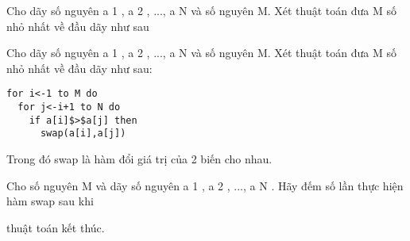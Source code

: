 Cho dãy số nguyên a 1 , a 2 , ..., a N và số nguyên M. Xét thuật toán đưa M số nhỏ nhất về đầu dãy như sau

Cho dãy số nguyên a 1 , a 2 , ..., a N và số nguyên M. Xét thuật toán đưa M số nhỏ nhất về đầu dãy như sau:
\begin{verbatim}
for i<-1 to M do
  for j<-i+1 to N do
    if a[i]$>$a[j] then
      swap(a[i],a[j])\end{verbatim}

Trong đó swap là hàm đổi giá trị của 2 biến cho nhau.

Cho số nguyên M và dãy số nguyên a 1 , a 2 , ..., a N . Hãy đếm số lần thực hiện hàm swap sau khi

thuật toán kết thúc.
